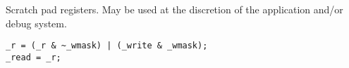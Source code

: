 
Scratch pad registers. May be used at the discretion of the application and/or
debug system.

\declaration{}
\implementation{}
\begin{lstlisting}
_r = (_r & ~_wmask) | (_write & _wmask);
_read = _r;
\end{lstlisting}

